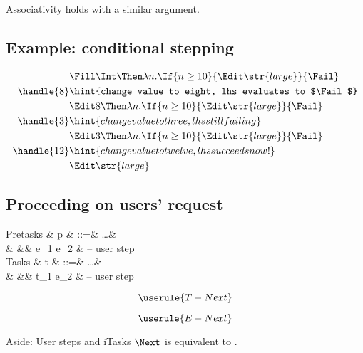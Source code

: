 Associativity holds with a similar argument.


\subsection{Example: conditional stepping}


\begin{align*}
    & \Fill \Int \Then \lambda n. \If{n \ge 10}{\Edit \str{large}}{\Fail} \\
  \handle{8} & \hint{change value to eight, lhs evaluates to $\Fail$} \\
    & \Edit 8 \Then \lambda n. \If{n \ge 10}{\Edit \str{large}}{\Fail} \\
  \handle{3} & \hint{change value to three, lhs still failing} \\
    & \Edit 3 \Then \lambda n. \If{n \ge 10}{\Edit \str{large}}{\Fail} \\
  \handle{12} & \hint{change value to twelve, lhs succeeds now!} \\
    & \Edit \str{large}
\end{align*}

\subsection{Proceeding on users' request}

\begin{grammar}
  Pretasks
    & p & ::=& \ldots        & \\
    &   &\mid& e_1 \Next e_2 & – user step \\
  Tasks
    & t & ::=& \ldots        & \\
    &   &\mid& t_1 \Next e_2 & – user step \\
\end{grammar}

\begin{equation*}
  \userule{T-Next}
\end{equation*}

\begin{equation*}
  \userule{E-Next}
\end{equation*}

\begin{margintext}{Aside: User steps and iTasks}
  $\Next$ is equivalent to \type{>>=}.
\end{margintext}


